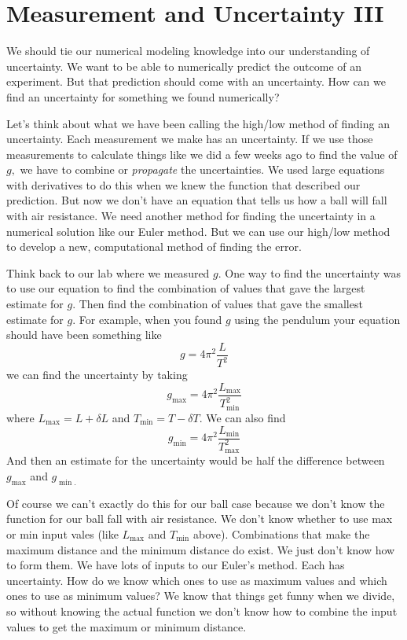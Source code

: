 \documentclass[twoside,11pt,ShortChapTitles]{BYUTextbook}
\begin{document}
\chapter{Measurement and Uncertainty III}

We should tie our numerical modeling knowledge into our understanding of
uncertainty. We want to be able to numerically predict the outcome of an
experiment. But that prediction should come with an uncertainty. How can we
find an uncertainty for something we found numerically?

Let's think about what we have been calling the high/low method of finding
an uncertainty. Each measurement we make has an uncertainty. If we use those
measurements to calculate things like we did a few weeks ago to find the
value of $g,$ we have to combine or \emph{propagate} the uncertainties. We
used large equations with derivatives to do this when we knew the function
that described our prediction. But now we don't have an equation that tells
us how a ball will fall with air resistance. We need another method for
finding the uncertainty in a numerical solution like our Euler method. But
we can use our high/low method to develop a new, computational method of
finding the error.

Think back to our lab where we measured $g.$ One way to find the uncertainty
was to use our equation to find the combination of values that gave the
largest estimate for $g.$ Then find the combination of values that gave the
smallest estimate for $g.$ For example, when you found $g$ using the
pendulum your equation should have been something like 
\[
g=4\pi ^{2}\frac{L}{T^{2}} 
\]%
we can find the uncertainty by taking 
\[
g_{\max }=4\pi ^{2}\frac{L_{\max }}{T_{\min }^{2}} 
\]%
where $L_{\max }=L+\delta L$ and $T_{\min }=T-\delta T.$ We can also find 
\[
g_{\min }=4\pi ^{2}\frac{L_{\min }}{T_{\max }^{2}} 
\]%
And then an estimate for the uncertainty would be half the difference
between $g_{\max }$ and $g_{\min .}$

Of course we can't exactly do this for our ball case because we don't know
the function for our ball fall with air resistance. We don't know whether to
use max or min input vales (like $L_{\max }$ and $T_{\min }$ above).
Combinations that make the maximum distance and the minimum distance do
exist. We just don't know how to form them. We have lots of inputs to our
Euler's method. Each has uncertainty. How do we know which ones to use as
maximum values and which ones to use as minimum values? We know that things
get funny when we divide, so without knowing the actual function we don't
know how to combine the input values to get the maximum or minimum distance.
\end{document}
